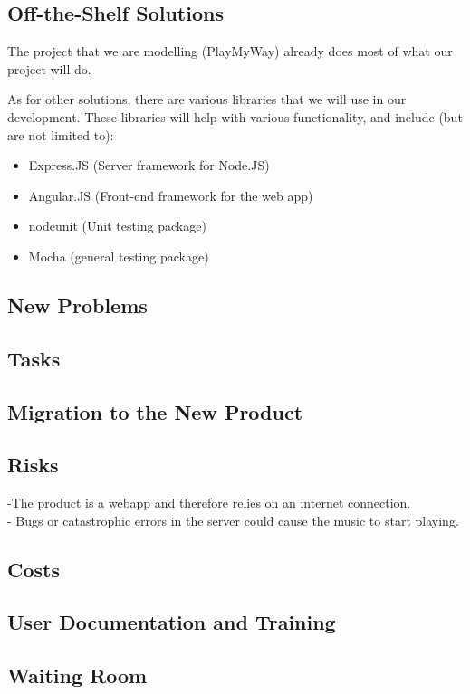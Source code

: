 \documentclass[12pt, titlepage]{article}
\begin{document}
\subsection{Off-the-Shelf Solutions}

The project that we are modelling (PlayMyWay) already does most of what our
project will do.

As for other solutions, there are various libraries that we will use in our
development. These libraries will help with various functionality, and include
(but are not limited to):
\begin{itemize}
\item Express.JS (Server framework for Node.JS)
\item Angular.JS (Front-end framework for the web app)
\item nodeunit (Unit testing package)
\item Mocha (general testing package)
\end{itemize}
\subsection{New Problems}

\subsection{Tasks}

\subsection{Migration to the New Product}

\subsection{Risks}
-The product is a webapp and therefore relies on an internet connection. \\
- Bugs or catastrophic errors in the server could cause the music to start
  playing. \\
\subsection{Costs}

\subsection{User Documentation and Training}

\subsection{Waiting Room}
\end{document}
